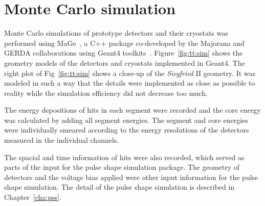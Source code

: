 
\section{Monte Carlo simulation} 
\label{sec:tt:sim}
Monte Carlo simulations of prototype detectors and their cryostats was
performed using MaGe~\cite{Mag08}, a C++ package co-developed by the
Majorana and GERDA collaborations using Geant4
toolkits~\cite{Gea03,Gea06}. Figure~\ref{fig:tt:sim} shows the
geometry models of the detectors and cryostats implemented in Geant4.
The right plot of Fig~\ref{fig:tt:sim} shows a close-up of the
\emph{Siegfried} II geometry. It was modeled in such a way that the
details were implemented as close as possible to reality while the
simulation efficiency did not decrease too much.

The energy depositions of hits in each segment were recorded and the
core energy was calculated by adding all segment energies. The segment
and core energies were individually smeared according to the energy
resolutions of the detectors measured in the individual channels.

The spacial and time information of hits were also recorded, which
served as parts of the input for the pulse shape simulation package.
The geometry of detectors and the voltage bias applied were other
input information for the pulse shape simulation. The detail of the
pulse shape simulation is described in Chapter~\ref{cha:pss}.
 
